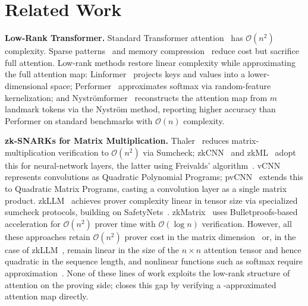 \section{Related Work}\label{sec:related}

\textbf{Low-Rank Transformer.}
Standard Transformer attention~\cite{OriginalTransformer} has $\mathcal{O}(n^2)$ complexity. Sparse patterns~\cite{SparseTransformer,Longformer} and memory compression~\cite{CompressiveTransformer} reduce cost but sacrifice full attention. Low-rank methods restore linear complexity while approximating the full attention map: Linformer~\cite{Linformer} projects keys and values into a lower-dimensional space; Performer~\cite{Performer} approximates softmax via random-feature kernelization; and Nystr\"omformer~\cite{Nystromformer} reconstructs the attention map from $m$ landmark tokens via the Nystr\"om method, reporting higher accuracy than Performer on standard benchmarks with $\mathcal{O}(n)$ complexity.

\textbf{zk-SNARKs for Matrix Multiplication.}
Thaler~\cite{Thaler} reduces matrix-multiplication verification to $\mathcal{O}(n^2)$ via Sumcheck; zkCNN~\cite{zkCNN} and zkML~\cite{zkML} adopt this for neural-network layers, the latter using Freivalds' algorithm~\cite{Freivalds}. vCNN~\cite{vCNN} represents convolutions as Quadratic Polynomial Programs; pvCNN~\cite{pvCNN} extends this to Quadratic Matrix Programs, casting a convolution layer as a single matrix product. zkLLM~\cite{zkLLM} achieves prover complexity linear in tensor size via specialized sumcheck protocols, building on SafetyNets~\cite{SafetyNets}. zkMatrix~\cite{zkMatrix} uses Bulletproofs-based acceleration for $\mathcal{O}(n^2)$ prover time with $\mathcal{O}(\log n)$ verification. However, all these approaches retain $\mathcal{O}(n^2)$ prover cost in the matrix dimension~\cite{Thaler,zkCNN,vCNN,pvCNN,zkML,zkMatrix} or, in the case of zkLLM~\cite{zkLLM}, remain linear in the size of the $n \times n$ attention tensor and hence quadratic in the sequence length, and nonlinear functions such as softmax require approximation~\cite{zkVC}. None of these lines of work exploits the low-rank structure of attention on the proving side; \name closes this gap by verifying a \nystrom-approximated attention map directly.
